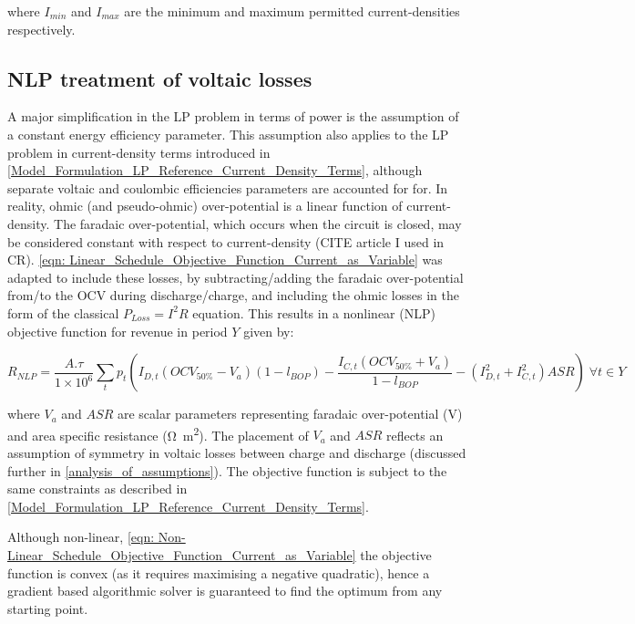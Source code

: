 \documentclass[preprint,3p,review,authoryear,10pt]{elsarticle}
\begin{document}
where $I_{min}$ and $I_{max}$ are the minimum and maximum permitted current-densities respectively.

\subsection{NLP treatment of voltaic losses}
\label{Model_Formulation_NLP_treatment_voltaic_losses}
A major simplification in the LP problem in terms of power is the assumption of a constant energy efficiency parameter. This assumption also applies to the LP problem in current-density terms introduced in \cref{Model_Formulation_LP_Reference_Current_Density_Terms}, although separate voltaic and coulombic efficiencies parameters are accounted for for. In reality, ohmic (and pseudo-ohmic) over-potential is a linear function of current-density. The faradaic over-potential, which occurs when the circuit is closed, may be considered constant with respect to current-density (CITE article I used in CR). \cref{eqn: Linear_Schedule_Objective_Function_Current_as_Variable} was adapted to include these losses, by subtracting/adding the faradaic over-potential from/to the OCV during discharge/charge, and including the ohmic losses in the form of the classical $P_{Loss} = I^2R$ equation. This results in a nonlinear (NLP) objective function for revenue in period $Y$ given by:

\begin{equation}
\label{eqn: Non-Linear_Schedule_Objective_Function_Current_as_Variable}
R_{NLP} = \frac{A.\tau}{1\times 10^{6}}\sum_{t}p_{t}(I_{D, t}(OCV_{50\%} - V_a)(1-l_{BOP}) - \frac{I_{C, t}(OCV_{50\%} + V_a)}{1-l_{BOP}} - (I_{D,t}^{2} + I_{C,t}^{2})ASR) \; \forall t \in Y
\end{equation}


where $V_a$ and $ASR$ are scalar parameters representing faradaic over-potential (\si{\volt}) and area specific resistance (\si{\ohm\square\meter}). The placement of $V_a$ and $ASR$ reflects an assumption of symmetry in voltaic losses between charge and discharge (discussed further in \cref{analysis_of_assumptions}). The objective function is subject to the same constraints as described in \cref{Model_Formulation_LP_Reference_Current_Density_Terms}.

Although non-linear, \cref{eqn: Non-Linear_Schedule_Objective_Function_Current_as_Variable} the objective function is convex (as it requires maximising a negative quadratic), hence a gradient based algorithmic solver is guaranteed to find the optimum from any starting point. 
\end{document}
